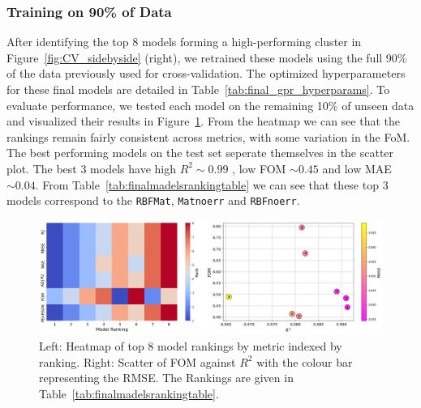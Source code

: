 \documentclass[10pt]{article}
\begin{document}
\subsubsection*{Training on 90\% of Data}
After identifying the top 8 models forming a high-performing cluster in Figure~\ref{fig:CV_sidebyside} (right),
we retrained these models using the full 90\% of the data previously used for cross-validation. The optimized hyperparameters for these final models are detailed in Table~\ref{tab:final_gpr_hyperparams}. 
To evaluate performance, we tested each model on the remaining 10\% of unseen data and visualized their results in Figure~\ref{fig:comparing_metrics}.
From the heatmap we can see that the rankings remain fairly consistent across metrics, with some variation in the FoM. The best performing models on the test set seperate themselves in the scatter plot. The best 3 models have high \(R^2 \sim 0.99\) , low FOM \(\sim 0.45\) and low MAE \(\sim 0.04\).
From Table~\ref{tab:finalmadelsrankingtable} we can see that these top 3 models correspond to the \texttt{RBFMat}, \texttt{Matnoerr} and \texttt{RBFnoerr}.
\begin{figure}[H]
    \centering
    \includegraphics[width=\textwidth]{LatexPlots/final_gps_plots/metric_of_finalists_comparison.png}
    \caption{Left: Heatmap of top 8 model rankings by metric indexed by ranking.
    Right: Scatter of FOM against \(R^2\) with the colour bar representing the RMSE.
    The Rankings are given in Table~\ref{tab:finalmadelsrankingtable}.}
    \label{fig:comparing_metrics}
\end{figure}
\end{document}
